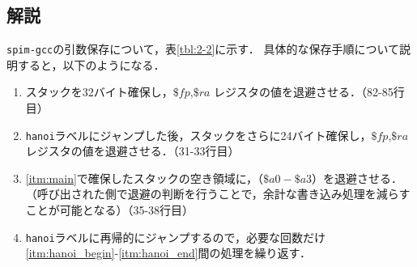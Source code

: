 \documentclass[a4j,11pt]{jarticle}
\begin{document}
\subsection{解説}

{\tt spim-gcc}の引数保存について，表\ref{tbl:2-2}に示す．
具体的な保存手順について説明すると，以下のようになる．
\begin{enumerate}
      \item \label{itm:main}スタックを32バイト確保し，$\$fp$,$\$ra$ レジスタの値を退避させる．（82-85行目）
      \item \label{itm:hanoi_begin}{\tt hanoi}ラベルにジャンプした後，スタックをさらに24バイト確保し，$\$fp$,$\$ra$ レジスタの値を退避させる．（31-33行目）
      \item \label{itm:hanoi_end}\ref{itm:main}で確保したスタックの空き領域に，（$\$a0-\$a3$）を退避させる．（呼び出された側で退避の判断を行うことで，余計な書き込み処理を減らすことが可能となる）（35-38行目）
      \item {\tt hanoi}ラベルに再帰的にジャンプするので，必要な回数だけ\ref{itm:hanoi_begin}-\ref{itm:hanoi_end}間の処理を繰り返す．
\end{enumerate}
\end{document}
